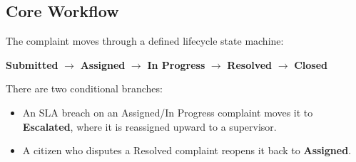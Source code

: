 \documentclass[12pt,a4paper]{article}
\begin{document}
\subsection{Core Workflow}

The complaint moves through a defined lifecycle state machine:

\begin{center}
\textbf{Submitted} $\rightarrow$ \textbf{Assigned} $\rightarrow$ \textbf{In Progress} $\rightarrow$ \textbf{Resolved} $\rightarrow$ \textbf{Closed}
\end{center}

There are two conditional branches:
\begin{itemize}
    \item An SLA breach on an Assigned/In Progress complaint moves it to \textbf{Escalated}, where it is reassigned upward to a supervisor.
    \item A citizen who disputes a Resolved complaint reopens it back to \textbf{Assigned}.
\end{itemize}
\end{document}
